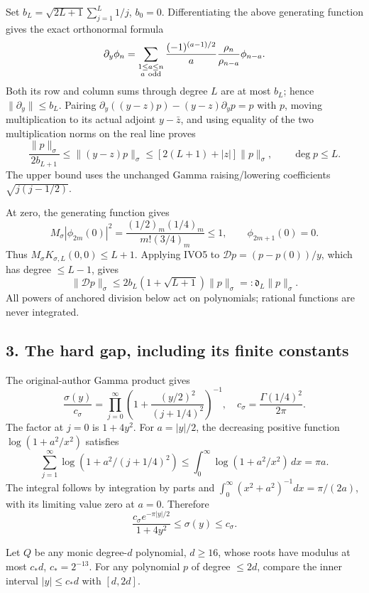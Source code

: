 \documentclass[11pt]{article}
\begin{document}
Set \(b_L=\sqrt{2L+1}\sum_{j=1}^L1/j\), \(b_0=0\). Differentiating the above generating function gives the exact orthonormal formula \[
\partial_y\phi_n=\sum_{\substack{1\le a\le n\\a\ {\rm odd}}}
\frac{(-1)^{(a-1)/2}}a\frac{\rho_n}{\rho_{n-a}}\phi_{n-a}.
\] Both its row and column sums through degree \(L\) are at most \(b_L\); hence \(\|\partial_y\|\le b_L\). Pairing \(\partial_y((y-z)p)-(y-z)\partial_yp=p\) with \(p\), moving multiplication to its actual adjoint \(y-\bar z\), and using equality of the two multiplication norms on the real line proves \[
\frac{\|p\|_\sigma}{2b_{L+1}}\le\|(y-z)p\|_\sigma
\le[2(L+1)+|z|]\|p\|_\sigma,\qquad \deg p\le L.
\tag{IVO5}
\] The upper bound uses the unchanged Gamma raising/lowering coefficients \(\sqrt{j(j-1/2)}\).

At zero, the generating function gives \[
M_\sigma|\phi_{2m}(0)|^2
=\frac{(1/2)_m(1/4)_m}{m!(3/4)_m}\le1,\qquad \phi_{2m+1}(0)=0.
\] Thus \(M_\sigma K_{\sigma,L}(0,0)\le L+1\). Applying IVO5 to \({\mathscr D}p=(p-p(0))/y\), which has degree \(\le L-1\), gives \[
\|{\mathscr D}p\|_\sigma
\le2b_L(1+\sqrt{L+1})\|p\|_\sigma=:\mathfrak d_L\|p\|_\sigma.
\tag{IVO6}
\] All powers of anchored division below act on polynomials; rational functions are never integrated.

\subsection{3. The hard gap, including its finite constants}\label{the-hard-gap-including-its-finite-constants}

The original-author Gamma product gives \[
\frac{\sigma(y)}{c_\sigma}
=\prod_{j=0}^\infty\left(1+\frac{(y/2)^2}{(j+1/4)^2}\right)^{-1},
\quad c_\sigma=\frac{\Gamma(1/4)^2}{2\pi}.
\] The factor at \(j=0\) is \(1+4y^2\). For \(a=|y|/2\), the decreasing positive function \(\log(1+a^2/x^2)\) satisfies \[
\sum_{j=1}^\infty\log(1+a^2/(j+1/4)^2)
\le\int_0^\infty\log(1+a^2/x^2)\,dx=\pi a.
\] The integral follows by integration by parts and \(\int_0^\infty (x^2+a^2)^{-1}dx=\pi/(2a)\), with its limiting value zero at \(a=0\). Therefore \[
\frac{c_\sigma e^{-\pi|y|/2}}{1+4y^2}\le\sigma(y)\le c_\sigma.
\tag{IVO7}
\]

Let \(Q\) be any monic degree-\(d\) polynomial, \(d\ge16\), whose roots have modulus at most \(c_*d\), \(c_*=2^{-13}\). For any polynomial \(p\) of degree \(\le2d\), compare the inner interval \(|y|\le c_*d\) with \([d,2d]\).
\end{document}
